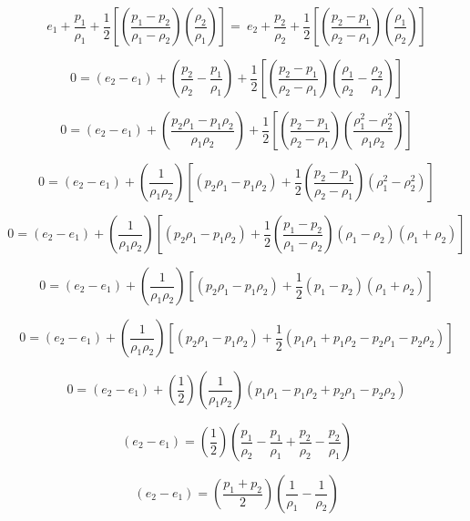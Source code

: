 \documentclass[../main.tex]{subfiles}
\begin{document}
\[
    e_1 + \frac{p_1}{\rho_1} + \frac{1}{2} \left[{\left({\frac{p_1-p_2}{\rho_1-\rho_2}}\right) \left({\frac{\rho_2}{\rho_1}}\right)}\right] =\
    e_2 + \frac{p_2}{\rho_2} + \frac{1}{2} \left[{\left({\frac{p_2-p_1}{\rho_2-\rho_1}}\right) \left({\frac{\rho_1}{\rho_2}}\right)}\right]
\] 


\[
   0  =  \left({e_2 - e_1}\right) + \left({\frac{p_2}{\rho_2}-\frac{p_1}{\rho_1}}\right) + 
   \frac{1}{2} \left[{\left({\frac{p_2-p_1}{\rho_2-\rho_1}}\right) \left({\frac{\rho_1}{\rho_2} - \frac{\rho_2}{\rho_1}}\right)}\right]
\]

\[
   0  =  \left({e_2 - e_1}\right) + \left({\frac{p_2\rho_1 - p_1\rho_2}{\rho_1\rho_2}}\right) + 
   \frac{1}{2} \left[{\left({\frac{p_2-p_1}{\rho_2-\rho_1}}\right) \left({\frac{\rho_1^2-\rho_2^2}{\rho_1\rho_2}}\right)}\right]
\]

\[
   0  =  \left({e_2 - e_1}\right) + 
   \left({\frac{1}{\rho_1\rho_2}}\right)
   \left[{
    \left({p_2\rho_1 - p_1\rho_2}\right) +
    \frac{1}{2} \left({\frac{p_2-p_1}{\rho_2-\rho_1}}\right) \left({\rho_1^2-\rho_2^2}\right)
   }\right]
\]

\[
    0  =  \left({e_2 - e_1}\right) + 
    \left({\frac{1}{\rho_1\rho_2}}\right)
    \left[{
    \left({p_2\rho_1 - p_1\rho_2}\right) +
    \frac{1}{2} \left({\frac{p_1-p_2}{\rho_1-\rho_2}}\right) \left({\rho_1-\rho_2}\right) \left({\rho_1+\rho_2}\right)
    }\right]
\]

\[
    0  =  \left({e_2 - e_1}\right) + 
    \left({\frac{1}{\rho_1\rho_2}}\right)
    \left[{
    \left({p_2\rho_1 - p_1\rho_2}\right) +
    \frac{1}{2} \left({p_1-p_2}\right) \left({\rho_1+\rho_2}\right)
    }\right]
\]

\[
    0  =  \left({e_2 - e_1}\right) + 
    \left({\frac{1}{\rho_1\rho_2}}\right)
    \left[{
    \left({p_2\rho_1 - p_1\rho_2}\right) +
    \frac{1}{2} \left({p_1\rho_1 + p_1\rho_2 - p_2\rho_1 -p_2\rho_2}\right)
    }\right]
\]

\[
    0  =  \left({e_2 - e_1}\right) + 
    \left({\frac{1}{2}}\right)
    \left({\frac{1}{\rho_1\rho_2}}\right)
    \left({p_1\rho_1 - p_1\rho_2 + p_2\rho_1 -p_2\rho_2}\right)
\]

\[
    \left({e_2 - e_1}\right) =
    \left({\frac{1}{2}}\right)
    \left({\frac{p_1}{\rho_2} - \frac{p_1}{\rho_1} + \frac{p_2}{\rho_2} - \frac{p_2}{\rho_1}}\right)
\]

\[
    \left({e_2 - e_1}\right) =
    \left({\frac{p_1 + p_2}{2}}\right)
    \left({\frac{1}{\rho_1} - \frac{1}{\rho_2}}\right)
\]
\end{document}
